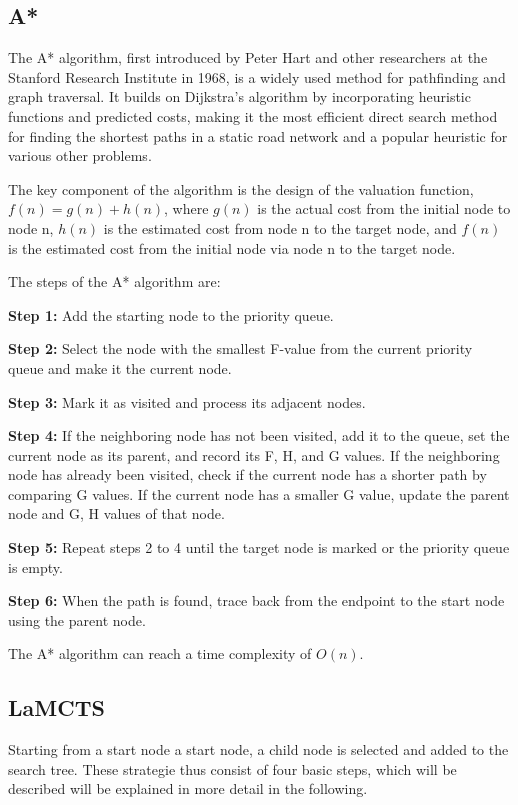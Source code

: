 \documentclass[bibliography=totoc]{scrartcl}
\begin{document}
\subsection{A*}
The A* algorithm, first introduced by Peter Hart and other researchers at the Stanford Research Institute in 1968, is a widely used method for pathfinding and graph traversal. \cite{4082128} It builds on Dijkstra's algorithm by incorporating heuristic functions and predicted costs, making it the most efficient direct search method for finding the shortest paths in a static road network and a popular heuristic for various other problems.\cite{ProbabilisticApproachCollaborativeMultiRobotLocalization}

The key component of the algorithm is the design of the valuation function, $f(n) = g(n) + h(n)$, where $g(n)$ is the actual cost from the initial node to node n, $h(n)$ is the estimated cost from node n to the target node, and $f(n)$ is the estimated cost from the initial node via node n to the target node.

The steps of the A* algorithm are:

\textbf{Step 1:} Add the starting node to the priority queue.

\textbf{Step 2:} Select the node with the smallest F-value from the current priority queue and make it the current node.

\textbf{Step 3:} Mark it as visited and process its adjacent nodes.

\textbf{Step 4:} If the neighboring node has not been visited, add it to the queue, set the current node as its parent, and record its F, H, and G values. If the neighboring node has already been visited, check if the current node has a shorter path by comparing G values. If the current node has a smaller G value, update the parent node and G, H values of that node.

\textbf{Step 5:} Repeat steps 2 to 4 until the target node is marked or the priority queue is empty.

\textbf{Step 6:} When the path is found, trace back from the endpoint to the start node using the parent node.

The A* algorithm can reach a time complexity of $O(n)$.


\subsection{LaMCTS}
Starting from a start node a start node, a child node is selected and added to the search tree.
These strategie thus consist of four basic steps, which will be described will be explained in more detail in the following.
\end{document}

